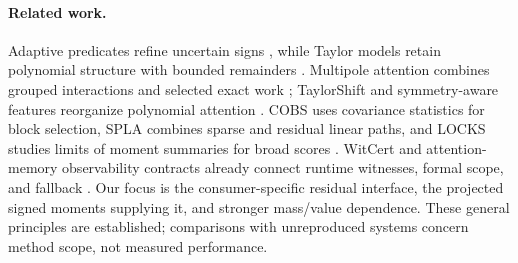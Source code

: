 \paragraph{Related work.}
Adaptive predicates refine uncertain signs \citep{shewchuk}, while Taylor
models retain polynomial structure with bounded remainders \citep{berz}.
Multipole attention combines grouped interactions and selected exact work
\citep{multipole,fma}; TaylorShift and symmetry-aware features reorganize
polynomial attention \citep{taylorshift,sata}. COBS uses covariance statistics
for block selection, SPLA combines sparse and residual linear paths, and
LOCKS studies limits of moment summaries for broad scores
\citep{cobs,spla,locks}. WitCert and attention-memory observability contracts
already connect runtime witnesses, formal scope, and fallback
\citep{observability,witcert}. Our focus is the consumer-specific residual
interface, the projected signed moments supplying it, and stronger mass/value
dependence. These general principles are established; comparisons with
unreproduced systems concern method scope, not measured performance.
